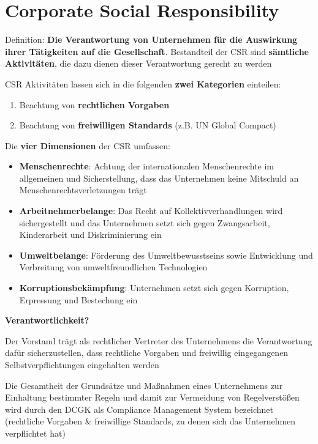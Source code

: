 \documentclass[
]{article}
\providecommand{\tightlist}{%
  \setlength{\itemsep}{0pt}\setlength{\parskip}{0pt}}
\begin{document}
\hypertarget{corporate-social-responsibility}{%
\section{Corporate Social
Responsibility}\label{corporate-social-responsibility}}

Definition: \textbf{Die Verantwortung von Unternehmen für die Auswirkung
ihrer Tätigkeiten auf die Gesellschaft}. Bestandteil der CSR sind
\textbf{sämtliche Aktivitäten}, die dazu dienen dieser Verantwortung
gerecht zu werden

CSR Aktivitäten lassen sich in die folgenden \textbf{zwei Kategorien}
einteilen:

\begin{enumerate}
\def\labelenumi{\arabic{enumi}.}
\tightlist
\item
  Beachtung von \textbf{rechtlichen Vorgaben }
\item
  Beachtung von \textbf{freiwilligen Standards} (z.B. UN Global Compact)
\end{enumerate}

Die \textbf{vier Dimensionen} der CSR umfassen:

\begin{itemize}
\tightlist
\item
  \textbf{Menschenrechte}: Achtung der internationalen Menschenrechte im
  allgemeinen und Sicherstellung, dass das Unternehmen keine Mitschuld
  an Menschenrechtsverletzungen trägt
\item
  \textbf{Arbeitnehmerbelange}: Das Recht auf Kollektivverhandlungen
  wird sichergestellt und das Unternehmen setzt sich gegen Zwangsarbeit,
  Kinderarbeit und Diskriminierung ein
\item
  \textbf{Umweltbelange}: Förderung des Umweltbewusstseins sowie
  Entwicklung und Verbreitung von umweltfreundlichen Technologien
\item
  \textbf{Korruptionsbekämpfung}: Unternehmen setzt sich gegen
  Korruption, Erpressung und Bestechung ein
\end{itemize}

\textbf{Verantwortlichkeit?}

Der Vorstand trägt als rechtlicher Vertreter des Unternehmens die
Verantwortung dafür sicherzustellen, dass rechtliche Vorgaben und
freiwillig eingegangenen Selbstverpflichtungen eingehalten werden

Die Gesamtheit der Grundsätze und Maßnahmen eines Unternehmens zur
Einhaltung bestimmter Regeln und damit zur Vermeidung von Regelverstößen
wird durch den DCGK als Compliance Management System bezeichnet
(rechtliche Vorgaben \& freiwillige Standards, zu denen sich das
Unternehmen verpflichtet hat)
\end{document}
